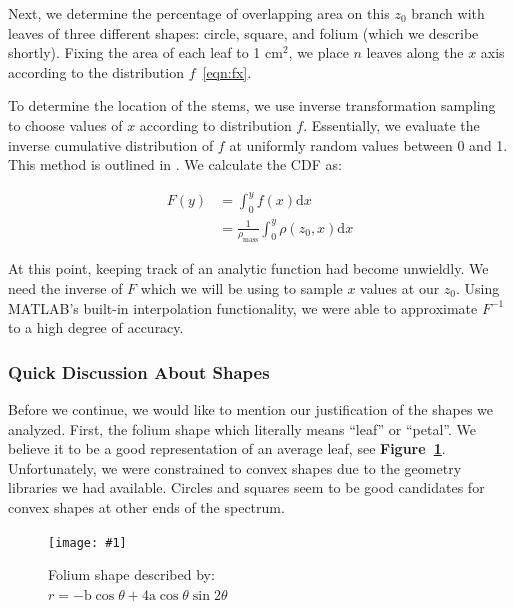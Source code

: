 \documentclass[10pt]{article}
\numberwithin{equation}{subsection}
\newlength{\imgwidth}
\newcommand{\scalegraphics}[1]{%
    \settowidth{\imgwidth}{\texttt{[image: \#1]}}%
    \setlength{\imgwidth}{\minof{\imgwidth}{\columnwidth}}%
    \texttt{[image: \#1]}%
}
\begin{document}
Next, we determine the percentage of overlapping area on this $z_0$
branch with leaves of three different shapes: circle, square, and folium
(which we describe shortly). Fixing the area of each leaf to 1
$\mathrm{cm}^2$, we place $n$ leaves along the $x$ axis according to
the distribution $f$~\eqref{eqn:fx}.

To determine the location of the stems, we use inverse transformation
sampling to choose values of $x$ according to distribution
$f$. Essentially, we evaluate the inverse cumulative distribution of
$f$ at uniformly random values between 0 and 1. This method is
outlined in \citep{invsample01}. We calculate the CDF as:

\begin{center}
  \begin{equation}
    \begin{split}
      F(y) &= \int_0^y f(x)\mathrm{d}x \\
      &= \frac{1}{\rho_{\mathrm{mass}}}\int_0^y \rho(z_0,x) \mathrm{d}x
    \end{split}
  \end{equation}
\end{center}

At this point, keeping track of an analytic function had become
unwieldly. We need the inverse of $F$ which we will be using to sample
$x$ values at our $z_0$. Using MATLAB's built-in interpolation
functionality, we were able to approximate $F^{-1}$ to a high degree
of accuracy.

\subsubsection{Quick Discussion About Shapes}
Before we continue, we would like to mention our justification of the
shapes we analyzed. First, the folium shape which literally means
``leaf'' or ``petal''. We believe it to be a good representation of an
average leaf, see {\bf Figure~\ref{fig:folium_shape}}. Unfortunately,
we were constrained to convex shapes due to the geometry libraries we
had available. Circles and squares seem to be good candidates for
convex shapes at other ends of the spectrum.

\begin{figure}[h!]
  \centering
  \scalegraphics{img/folium_single.png}
  \caption{Folium shape described by:\\ $r=-\mathrm{b}\cos\theta +
    4\mathrm{a}\cos\theta \sin2\theta$ ~\citep{foliumshape01}}
  \label{fig:folium_shape}
\end{figure}
\end{document}
